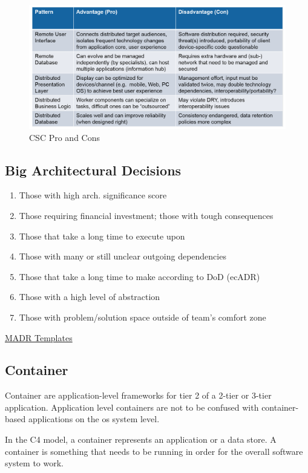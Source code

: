\documentclass[../Main.tex]{subfiles}
\begin{document}
\begin{figure}[H]
    \centering
    \includegraphics[width=1\linewidth]{Images/csc-pro-con.png}
    \caption{CSC Pro and Cons}
\end{figure}

\subsection{Big Architectural Decisions}
\begin{enumerate}
    \item Those with high arch. significance score
    \item Those requiring financial investment; those with tough consequences
    \item Those that take a long time to execute upon
    \item Those with many or still unclear outgoing dependencies
    \item Those that take a long time to make according to DoD (ecADR)
    \item Those with a high level of abstraction 
    \item Those with problem/solution space outside of team's comfort zone 
\end{enumerate}
\href{https://github.com/adr/madr}{MADR Templates}

\subsection{Container}
Container are application-level frameworks for tier 2 of a 2-tier or 3-tier
application. Application level containers are not to be confused with container-based
applications on the os system level. 

In the C4 model, a container represents an application or a data store.
    A container is something that needs to be running in order for the overall software system to work.
\end{document}
